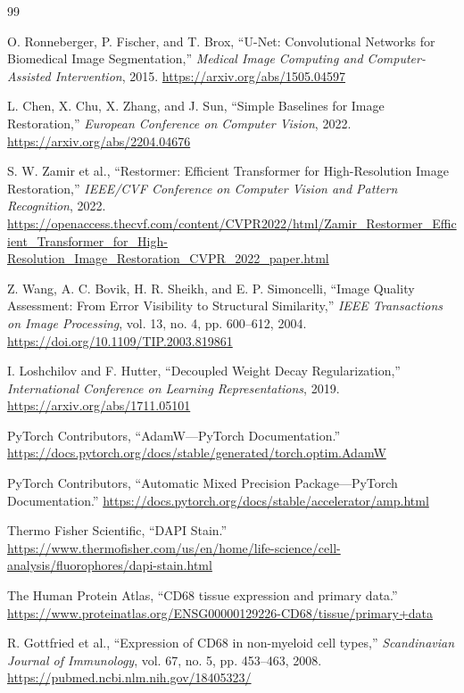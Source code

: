 \documentclass[12pt,a4paper,UTF8]{ctexart}
\begin{document}
\begin{thebibliography}{99}

O. Ronneberger, P. Fischer, and T. Brox,
``U-Net: Convolutional Networks for Biomedical Image Segmentation,''
\emph{Medical Image Computing and Computer-Assisted Intervention}, 2015.
\url{https://arxiv.org/abs/1505.04597}

L. Chen, X. Chu, X. Zhang, and J. Sun,
``Simple Baselines for Image Restoration,''
\emph{European Conference on Computer Vision}, 2022.
\url{https://arxiv.org/abs/2204.04676}

S. W. Zamir et al.,
``Restormer: Efficient Transformer for High-Resolution Image Restoration,''
\emph{IEEE/CVF Conference on Computer Vision and Pattern Recognition}, 2022.
\url{https://openaccess.thecvf.com/content/CVPR2022/html/Zamir_Restormer_Efficient_Transformer_for_High-Resolution_Image_Restoration_CVPR_2022_paper.html}

Z. Wang, A. C. Bovik, H. R. Sheikh, and E. P. Simoncelli,
``Image Quality Assessment: From Error Visibility to Structural Similarity,''
\emph{IEEE Transactions on Image Processing}, vol. 13, no. 4, pp. 600--612, 2004.
\url{https://doi.org/10.1109/TIP.2003.819861}

I. Loshchilov and F. Hutter,
``Decoupled Weight Decay Regularization,''
\emph{International Conference on Learning Representations}, 2019.
\url{https://arxiv.org/abs/1711.05101}

PyTorch Contributors,
``AdamW---PyTorch Documentation.''
\url{https://docs.pytorch.org/docs/stable/generated/torch.optim.AdamW}

PyTorch Contributors,
``Automatic Mixed Precision Package---PyTorch Documentation.''
\url{https://docs.pytorch.org/docs/stable/accelerator/amp.html}

Thermo Fisher Scientific,
``DAPI Stain.''
\url{https://www.thermofisher.com/us/en/home/life-science/cell-analysis/fluorophores/dapi-stain.html}

The Human Protein Atlas,
``CD68 tissue expression and primary data.''
\url{https://www.proteinatlas.org/ENSG00000129226-CD68/tissue/primary+data}

R. Gottfried et al.,
``Expression of CD68 in non-myeloid cell types,''
\emph{Scandinavian Journal of Immunology}, vol. 67, no. 5, pp. 453--463, 2008.
\url{https://pubmed.ncbi.nlm.nih.gov/18405323/}


\end{thebibliography}
\end{document}
